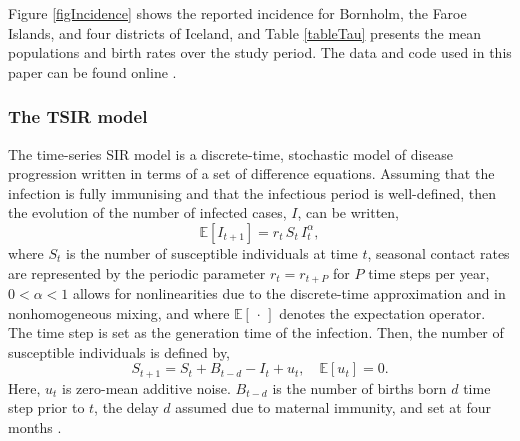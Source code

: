 \documentclass[10pt]{article}
\begin{document}
Figure \ref{figIncidence} shows the reported incidence for Bornholm, the Faroe Islands, and four districts of Iceland, and Table \ref{tableTau} presents the mean populations and birth rates over the study period. The data and code used in this paper can be found online \cite{github}.










\subsubsection*{The TSIR model}

The time-series SIR model \cite{Finkenstadt2000} is a discrete-time, stochastic model of disease progression written in terms of a set of difference equations. Assuming that the infection is fully immunising and that the infectious period is well-defined, then the evolution of the number of infected cases, $I$, can be written,
\begin{equation}
\mathbb{E}\left[I_{t+1}\right] = r_t \, S_t \, I_t^\alpha,
\label{TSIR_I}
\end{equation}
where $S_t$ is the number of susceptible individuals at time $t$, seasonal contact rates are represented by the periodic parameter $r_t = r_{t+P}$ for $P$ time steps per year, $0 < \alpha < 1$ allows for nonlinearities due to the discrete-time approximation and in nonhomogeneous mixing, and where $\mathbb{E}\left[\,\cdot\,\right]$ denotes the expectation operator. The time step is set as the generation time of the infection. Then, the number of susceptible individuals is defined by,
\begin{equation}
S_{t+1} = S_t + B_{t-d} - I_t + u_t, \quad \mathbb{E}\left[u_t\right] = 0.
\label{TSIR_S}
\end{equation}
Here, $u_t$ is  zero-mean additive noise. $B_{t-d}$ is the number of births born $d$ time step prior to $t$, the delay $d$ assumed due to maternal immunity, and set at four months \cite{Anderson1991}.
\end{document}
